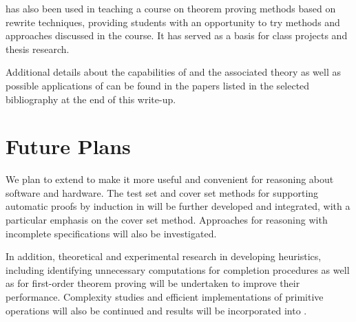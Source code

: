 \RRL has also been used in teaching a course on theorem proving
methods based on rewrite techniques, 
providing students with an opportunity to try methods and
approaches discussed in the course.  It has served as a basis for
class projects and thesis research. 

Additional details about the capabilities of \RRL and the associated theory
as well as possible applications of \RRL can be found in the 
papers listed in the selected bibliography at the end of this write-up.

\section{Future Plans}

We plan to extend \RRL to make it more useful and convenient for
reasoning about software and hardware.  The test set and cover set methods
for supporting automatic proofs by induction in \RRL will be further
developed and integrated, with a particular emphasis on the cover set
method.  Approaches for reasoning with incomplete specifications will
also be investigated.

In addition, theoretical and experimental research in developing
heuristics, including identifying unnecessary computations for
completion procedures as well as for first-order theorem proving will
be undertaken to improve their performance.  Complexity studies and
efficient implementations of primitive operations will also be
continued and results will be incorporated into \ERRL.

